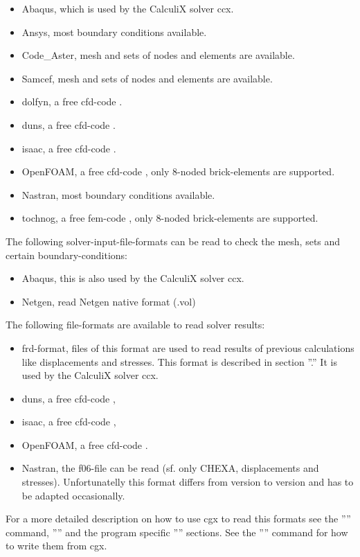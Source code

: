 \documentclass{article}
\begin{document}
\begin{itemize}
\item Abaqus, which is used by the CalculiX solver ccx.
\item Ansys, most boundary conditions available.
\item Code\_Aster, mesh and sets of nodes and elements are available.
\item Samcef, mesh and sets of nodes and elements are available.
\item dolfyn, a free cfd-code \cite{dolfyn}.
\item duns, a free cfd-code \cite{duns}.
\item isaac, a free cfd-code \cite{isaac}.
\item OpenFOAM, a free cfd-code \cite{OpenFOAM}, only 8-noded brick-elements are supported.
\item Nastran, most boundary conditions available.
\item tochnog, a free fem-code \cite{tochnog}, only 8-noded brick-elements are supported.
\end{itemize}
The following solver-input-file-formats can be read to check the mesh, sets and certain boundary-conditions:
\begin{itemize}
\item Abaqus, this is also used by the CalculiX solver ccx.
\item Netgen, read Netgen native format (.vol)
\end{itemize}
The following file-formats are available to read solver results:
\begin{itemize}
\item frd-format, files of this format are used to read results of previous calculations like displacements and stresses. This format is described in section ''.'' It is used by the CalculiX solver ccx. 
\item duns, a free cfd-code \cite{duns},
\item isaac, a free cfd-code \cite{isaac},
\item OpenFOAM, a free cfd-code \cite{OpenFOAM}.
\item Nastran, the f06-file can be read (sf. only CHEXA, displacements and stresses). Unfortunatelly this format differs from version to version and has to be adapted occasionally.
\end{itemize}
For a more detailed description on how to use cgx to read this formats see the '''' command, '''' and the program specific '''' sections.  See the '''' command for how to write them from cgx.
\end{document}

